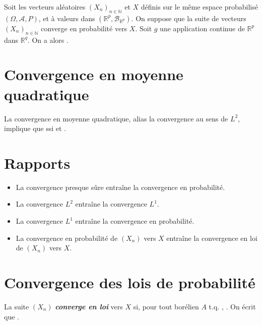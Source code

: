 \documentclass[10pt, french]{report}
\begin{document}
\begin{multicols*}{2}
\begin{definitionNOHFILL}
Soit les vecteurs aléatoires $(X_{n})_{n \in \mathbb{N}}$ et $X$ définis sur le même espace probabilisé $(\Omega, \mathcal{A}, P)$, et à valeurs dans $(\mathbb{R}^{p}, \mathcal{B}_{\mathbb{R}^{p}})$. On suppose que la suite de vecteurs $(X_{n})_{n \in \mathbb{N}}$ converge en probabilité vers $X$. Soit $g$ une application continue de $\mathbb{R}^{p}$ dans $\mathbb{R}^{q}$. On a alors .
\end{definitionNOHFILL}



\columnbreak
\section{Convergence en moyenne quadratique}
\begin{definitionNOHFILL}
La convergence en moyenne quadratique, alias la convergence au sens de $L^{2}$, implique que  ssi  et .
\end{definitionNOHFILL}




\section{Rapports}
\begin{itemize}
	\item	La convergence presque sûre entraîne la convergence en probabilité.
	\item	La convergence $L^{2}$ entraîne la convergence $L^{1}$.
	\item	La convergence $L^{1}$ entraîne la convergence en probabilité.
	\item	La convergence en probabilité de $(X_{n})$ vers $X$ entraîne la convergence en loi de $(X_{n})$ vers $X$.
\end{itemize}



\section{Convergence des lois de probabilité}
\begin{definitionNOHFILL}
La suite $(X_{n})$ \textbf{\textit{converge en loi}} vers $X$ si, pour tout borélien $A$ t.q. , . On écrit que .
\end{definitionNOHFILL}



\end{multicols*}
\end{document}
